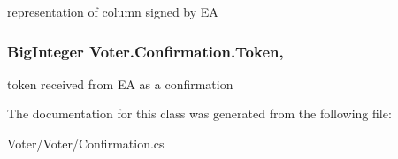 representation of column signed by E\+A 

\hypertarget{class_voter_1_1_confirmation_a98a095f7addc84318c6092181c3b7507}{}
\subsubsection[{Token}]{\setlength{\rightskip}{0pt plus 5cm}Big\+Integer Voter.\+Confirmation.\+Token\hspace{0.3cm}{\ttfamily [get]}, {\ttfamily [set]}}\label{class_voter_1_1_confirmation_a98a095f7addc84318c6092181c3b7507}


token received from E\+A as a confirmation 



The documentation for this class was generated from the following file\+:\begin{DoxyCompactItemize}
\item 
Voter/\+Voter/Confirmation.\+cs\end{DoxyCompactItemize}
